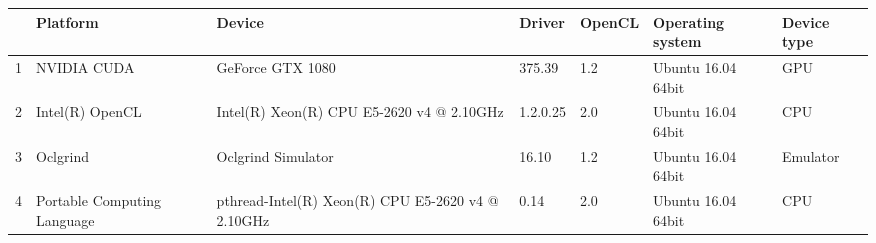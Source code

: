 \begin{tabular}{lllllll}
\toprule
{} &                     Platform &                                             Device &    Driver & OpenCL &    Operating system & Device type \\
\midrule
1 &                  NVIDIA CUDA &                                   GeForce GTX 1080 &    375.39 &    1.2 &  Ubuntu 16.04 64bit &         GPU \\
2 &              Intel(R) OpenCL &          Intel(R) Xeon(R) CPU E5-2620 v4 @ 2.10GHz &  1.2.0.25 &    2.0 &  Ubuntu 16.04 64bit &         CPU \\
3 &                     Oclgrind &                                 Oclgrind Simulator &     16.10 &    1.2 &  Ubuntu 16.04 64bit &    Emulator \\
4 &  Portable Computing Language &  pthread-Intel(R) Xeon(R) CPU E5-2620 v4 @ 2.10GHz &      0.14 &    2.0 &  Ubuntu 16.04 64bit &         CPU \\
\bottomrule
\end{tabular}
